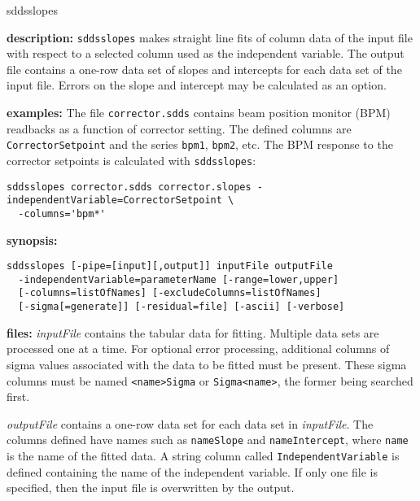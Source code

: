 \begin{sddsprog}{sddsslopes}
  \item \textbf{description:} \verb|sddsslopes| makes straight line fits of column data of the input file with respect to a selected column used as the independent variable. The output file contains a one-row data set of slopes and intercepts for each data set of the input file. Errors on the slope and intercept may be calculated as an option.

  \item \textbf{examples:} The file \verb|corrector.sdds| contains beam position monitor (BPM) readbacks as a function of corrector setting. The defined columns are \verb|CorrectorSetpoint| and the series \verb|bpm1|, \verb|bpm2|, etc. The BPM response to the corrector setpoints is calculated with \verb|sddsslopes|:
  \begin{verbatim}
sddsslopes corrector.sdds corrector.slopes -independentVariable=CorrectorSetpoint \
  -columns='bpm*'
  \end{verbatim}

  \item \textbf{synopsis:}
  \begin{verbatim}
sddsslopes [-pipe=[input][,output]] inputFile outputFile
  -independentVariable=parameterName [-range=lower,upper]
  [-columns=listOfNames] [-excludeColumns=listOfNames]
  [-sigma[=generate]] [-residual=file] [-ascii] [-verbose]
  \end{verbatim}

  \item \textbf{files:} \emph{inputFile} contains the tabular data for fitting. Multiple data sets are processed one at a time. For optional error processing, additional columns of sigma values associated with the data to be fitted must be present. These sigma columns must be named \verb|<name>Sigma| or \verb|Sigma<name>|, the former being searched first.

  \emph{outputFile} contains a one-row data set for each data set in \emph{inputFile}. The columns defined have names such as \verb|nameSlope| and \verb|nameIntercept|, where \verb|name| is the name of the fitted data. A string column called \verb|IndependentVariable| is defined containing the name of the independent variable. If only one file is specified, then the input file is overwritten by the output.


\end{sddsprog}
